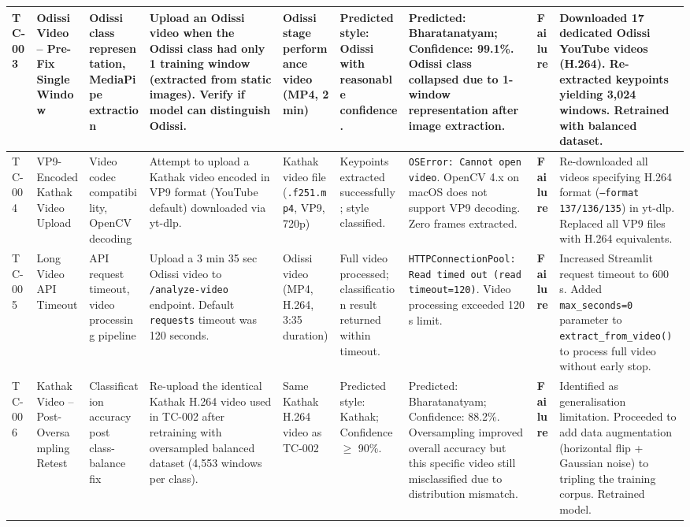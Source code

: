 \documentclass[12pt,a4paper]{article}
\begin{document}
\begin{longtable}{|P{0.6cm}|P{2.2cm}|P{2.2cm}|P{2.8cm}|P{2.4cm}|P{3.0cm}|P{3.0cm}|P{1.1cm}|P{2.4cm}|}
TC-003 &
Odissi Video -- Pre-Fix Single Window &
Odissi class representation, MediaPipe extraction &
Upload an Odissi video when the Odissi class had only 1 training window (extracted from static images). Verify if model can distinguish Odissi. &
Odissi stage performance video (MP4, 2 min) &
Predicted style: Odissi with reasonable confidence. &
Predicted: Bharatanatyam; Confidence: 99.1\%. Odissi class collapsed due to 1-window representation after image extraction. &
\textbf{Failure} &
Downloaded 17 dedicated Odissi YouTube videos (H.264). Re-extracted keypoints yielding 3,024 windows. Retrained with balanced dataset. \\
\hline

TC-004 &
VP9-Encoded Kathak Video Upload &
Video codec compatibility, OpenCV decoding &
Attempt to upload a Kathak video encoded in VP9 format (YouTube default) downloaded via yt-dlp. &
Kathak video file (\texttt{.f251.mp4}, VP9, 720p) &
Keypoints extracted successfully; style classified. &
\texttt{OSError: Cannot open video}. OpenCV 4.x on macOS does not support VP9 decoding. Zero frames extracted. &
\textbf{Failure} &
Re-downloaded all videos specifying H.264 format (\texttt{--format 137/136/135}) in yt-dlp. Replaced all VP9 files with H.264 equivalents. \\
\hline

TC-005 &
Long Video API Timeout &
API request timeout, video processing pipeline &
Upload a 3 min 35 sec Odissi video to \texttt{/analyze-video} endpoint. Default \texttt{requests} timeout was 120 seconds. &
Odissi video (MP4, H.264, 3:35 duration) &
Full video processed; classification result returned within timeout. &
\texttt{HTTPConnectionPool: Read timed out (read timeout=120)}. Video processing exceeded 120 s limit. &
\textbf{Failure} &
Increased Streamlit request timeout to 600 s. Added \texttt{max\_seconds=0} parameter to \texttt{extract\_from\_video()} to process full video without early stop. \\
\hline

TC-006 &
Kathak Video -- Post-Oversampling Retest &
Classification accuracy post class-balance fix &
Re-upload the identical Kathak H.264 video used in TC-002 after retraining with oversampled balanced dataset (4,553 windows per class). &
Same Kathak H.264 video as TC-002 &
Predicted style: Kathak; Confidence $\geq$ 90\%. &
Predicted: Bharatanatyam; Confidence: 88.2\%. Oversampling improved overall accuracy but this specific video still misclassified due to distribution mismatch. &
\textbf{Failure} &
Identified as generalisation limitation. Proceeded to add data augmentation (horizontal flip + Gaussian noise) to tripling the training corpus. Retrained model. \\
\hline


\end{longtable}
\end{document}
